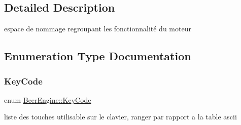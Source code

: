 \subsection{Detailed Description}
espace de nommage regroupant les fonctionnalité du moteur 

\subsection{Enumeration Type Documentation}
\mbox{\label{namespace_beer_engine_a94f0b552f6dc910de8cdb44207981f53}} 
\subsubsection{\texorpdfstring{Key\+Code}{KeyCode}}
{\footnotesize\ttfamily enum \mbox{\hyperlink{namespace_beer_engine_a94f0b552f6dc910de8cdb44207981f53}{Beer\+Engine\+::\+Key\+Code}}}



liste des touches utilisable sur le clavier, ranger par rapport a la table ascii 

